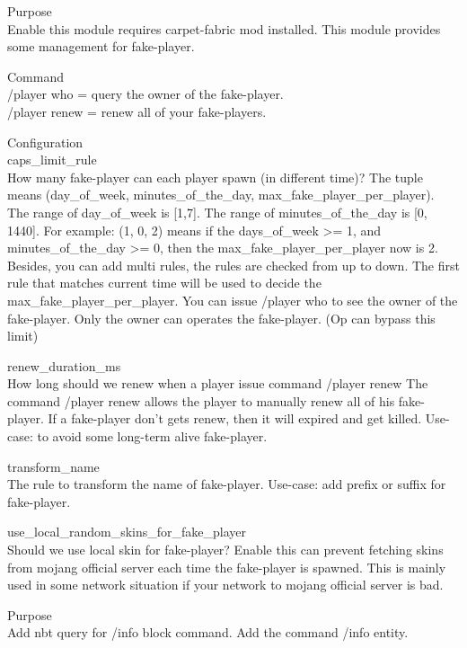 
Purpose\\
Enable this module requires carpet-fabric mod installed.
This module provides some management for fake-player.

Command\\
/player who = query the owner of the fake-player.\\
/player renew = renew all of your fake-players.

Configuration\\
caps\_limit\_rule\\
How many fake-player can each player spawn (in different time)?
The tuple means (day\_of\_week, minutes\_of\_the\_day, max\_fake\_player\_per\_player).
The range of day\_of\_week is [1,7].
The range of minutes\_of\_the\_day is [0, 1440].
For example: (1, 0, 2) means if the days\_of\_week >= 1, and minutes\_of\_the\_day >= 0, then the max\_fake\_player\_per\_player now is 2.
Besides, you can add multi rules, the rules are checked from up to down.
The first rule that matches current time will be used to decide the max\_fake\_player\_per\_player.
You can issue /player who to see the owner of the fake-player.
Only the owner can operates the fake-player. (Op can bypass this limit)

renew\_duration\_ms\\
How long should we renew when a player issue command /player renew
The command /player renew allows the player to manually renew all of his fake-player.
If a fake-player don't gets renew, then it will expired and get killed.
Use-case: to avoid some long-term alive fake-player.

transform\_name\\
The rule to transform the name of fake-player.
Use-case: add prefix or suffix for fake-player.

use\_local\_random\_skins\_for\_fake\_player\\
Should we use local skin for fake-player?
Enable this can prevent fetching skins from mojang official server each time the fake-player is spawned.
This is mainly used in some network situation if your network to mojang official server is bad.


Purpose\\
Add nbt query for /info block command.
Add the command /info entity.



